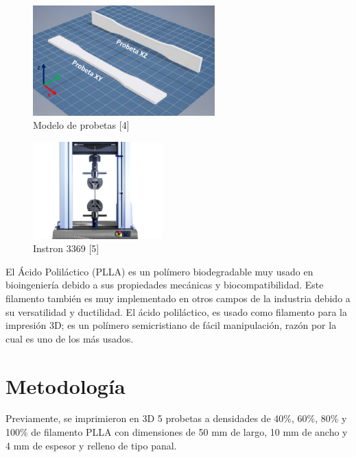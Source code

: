 \documentclass[journal,transmag]{IEEEtran}
\begin{document}
		\begin{figure}[!h]
		\center
		\includegraphics[width=7cm]{imagenes/segunda.png}
		\caption{Modelo de probetas [4]}
		\label{2}
	\end{figure}
		\begin{figure}[!h]
		\center
		\includegraphics[width=5cm]{imagenes/tercera.png}
		\caption{Instron 3369 [5] }
		\label{3}
	\end{figure}
	
	
El Ácido Poliláctico (PLLA) es un polímero biodegradable muy usado en bioingeniería debido a sus propiedades mecánicas y biocompatibilidad. Este filamento también es muy implementado en otros campos de la industria debido a su versatilidad y ductilidad. El ácido poliláctico, es usado como filamento para la impresión 3D; es un polímero semicristiano de fácil manipulación, razón por la cual es uno de los más usados.

\section{Metodología}

Previamente, se imprimieron en 3D 5 probetas a densidades de 40\%, 60\%, 80\% y 100\% de filamento PLLA con dimensiones de 50 mm de largo, 10 mm de ancho y 4 mm de espesor y relleno de tipo panal.
\end{document}
